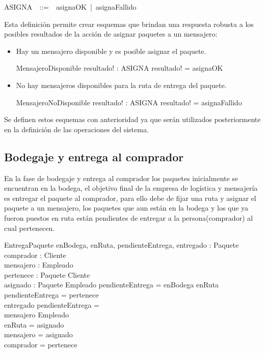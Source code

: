 \documentclass[12pt,a4paper,zed]{article}
\begin{document}
\begin{zed}
ASIGNA~~::=~~asignaOK~|~asignaFallido
\end{zed}

Esta definición permite crear esquemas que brindan una respuesta robusta a los posibles resultados de la acción de asignar paquetes a un mensajero:
\begin{itemize}
\item Hay un mensajero disponible y es posible asignar el paquete.
\begin{schema}{MensajeroDisponible}
resultado! : ASIGNA
\where
resultado! = asignaOK
\end{schema}

\item No hay mensajeros disponibles para la ruta de entrega del paquete.
\begin{schema}{MensajeroNoDisponible}
resultado! : ASIGNA
\where
resultado! = asignaFallido
\end{schema}
\end{itemize} 

Se definen estos esquemas con anterioridad ya que serán utilizados posteriormente en la definición de las operaciones del sistema.

\subsection{Bodegaje y entrega al comprador}

En la fase de bodegaje y entrega al comprador los paquetes inicialmente se encuentran en la bodega, el objetivo final de la empresa de logística y mensajería es entregar el paquete al comprador, para ello debe de fijar una ruta y asignar el paquete a un mensajero, los paquetes que aun están en la bodega y los que ya fueron puestos en ruta están pendientes de entregar a la persona(comprador) al cual pertenecen.

\begin{schema}{EntregaPaquete}
enBodega, enRuta, pendienteEntrega, entregado : \power Paquete\\
comprador : \power Cliente\\ 
mensajero : \power Empleado\\
pertenece : Paquete \pfun Cliente\\
asignado : Paquete \pfun Empleado
\where
pendienteEntrega = enBodega \cup enRuta \\
pendienteEntrega = \dom pertenece \\
entregado \cap pendienteEntrega = \emptyset \\
mensajero \subset Empleado \\
enRuta = \dom asignado\\
mensajero = \ran asignado\\
comprador = \ran pertenece
\end{schema}
\end{document}
